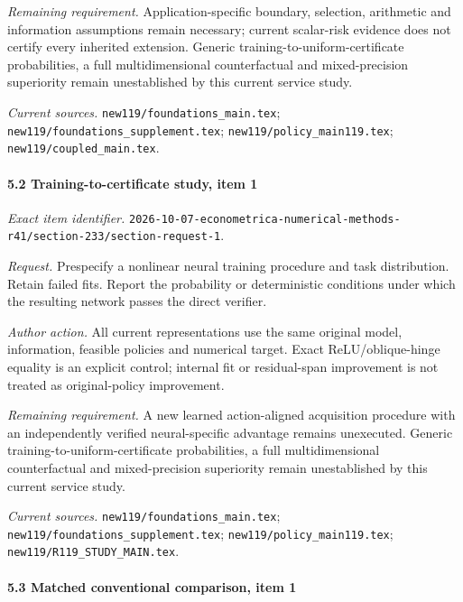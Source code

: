 \par\emph{Remaining requirement.} Application-specific boundary, selection, arithmetic and information assumptions remain necessary; current scalar-risk evidence does not certify every inherited extension. Generic training-to-uniform-certificate probabilities, a full multidimensional counterfactual and mixed-precision superiority remain unestablished by this current service study.

\par\emph{Current sources.} \nolinkurl{new119/foundations_main.tex}; \nolinkurl{new119/foundations_supplement.tex}; \nolinkurl{new119/policy_main119.tex}; \nolinkurl{new119/coupled_main.tex}.

\paragraph{5.2 Training-to-certificate study, item 1}

\emph{Exact item identifier.} \nolinkurl{2026-10-07-econometrica-numerical-methods-r41/section-233/section-request-1}.

\par\emph{Request.} Prespecify a nonlinear neural training procedure and task distribution. Retain failed fits. Report the probability or deterministic conditions under which the resulting network passes the direct verifier.

\par\emph{Author action.} All current representations use the same original model, information, feasible policies and numerical target. Exact ReLU/\allowbreak{}oblique-hinge equality is an explicit control; internal fit or residual-span improvement is not treated as original-policy improvement.

\par\emph{Remaining requirement.} A new learned action-aligned acquisition procedure with an independently verified neural-specific advantage remains unexecuted. Generic training-to-uniform-certificate probabilities, a full multidimensional counterfactual and mixed-precision superiority remain unestablished by this current service study.

\par\emph{Current sources.} \nolinkurl{new119/foundations_main.tex}; \nolinkurl{new119/foundations_supplement.tex}; \nolinkurl{new119/policy_main119.tex}; \nolinkurl{new119/R119_STUDY_MAIN.tex}.

\paragraph{5.3 Matched conventional comparison, item 1}

